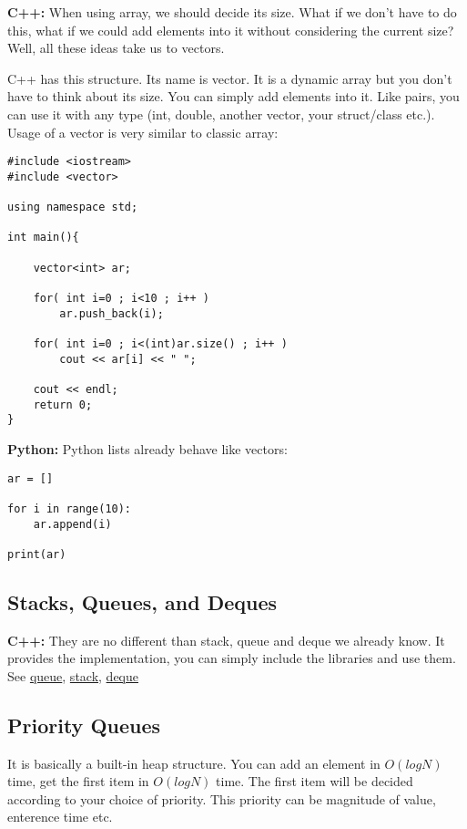 \documentclass[12pt]{article}
\begin{document}
\textbf{C++:} When using array, we should decide its size. What if we don't have to do this, what if we could add elements into it without considering the current size? Well, all these ideas take us to vectors.

C++ has this structure. Its name is vector. It is a dynamic array but you don't have to think about its size. You can simply add elements into it. Like pairs, you can use it with any type (int, double, another vector, your struct/class etc.). Usage of a vector is very similar to classic array:

\begin{verbatim}
#include <iostream>
#include <vector>

using namespace std;

int main(){

    vector<int> ar;

    for( int i=0 ; i<10 ; i++ )
        ar.push_back(i);
    
    for( int i=0 ; i<(int)ar.size() ; i++ )
        cout << ar[i] << " ";
    
    cout << endl;
    return 0;
}
\end{verbatim}

\textbf{Python:} Python lists already behave like vectors:

\begin{verbatim}
ar = []

for i in range(10):
    ar.append(i)

print(ar)
\end{verbatim}

\subsection{Stacks, Queues, and Deques}

\textbf{C++:} They are no different than stack, queue and deque we already know. It provides the implementation, you can simply include the libraries and use them. See \href{http://www.cplusplus.com/reference/queue/queue/}{queue}, \href{http://www.cplusplus.com/reference/stack/stack/}{stack}, \href{http://www.cplusplus.com/reference/deque/deque/}{deque}
\subsection{Priority Queues}
It is basically a built-in heap structure. You can add an element in $O(logN)$ time, get the first item in $O(logN)$ time. The first item will be decided according to your choice of priority. This priority can be magnitude of value, enterence time etc.
\end{document}

